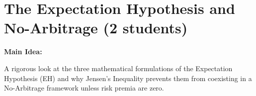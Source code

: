 \documentclass[12pt,a4paper]{article}
\begin{document}
%
%
%
%
%
%
%
%
%


\section{The Expectation Hypothesis and No-Arbitrage (2 students)}

\textbf{Main Idea:}

A rigorous look at the three mathematical formulations of the Expectation Hypothesis (EH) and why Jensen’s Inequality prevents them from coexisting in a No-Arbitrage framework unless risk premia are zero.
\end{document}
